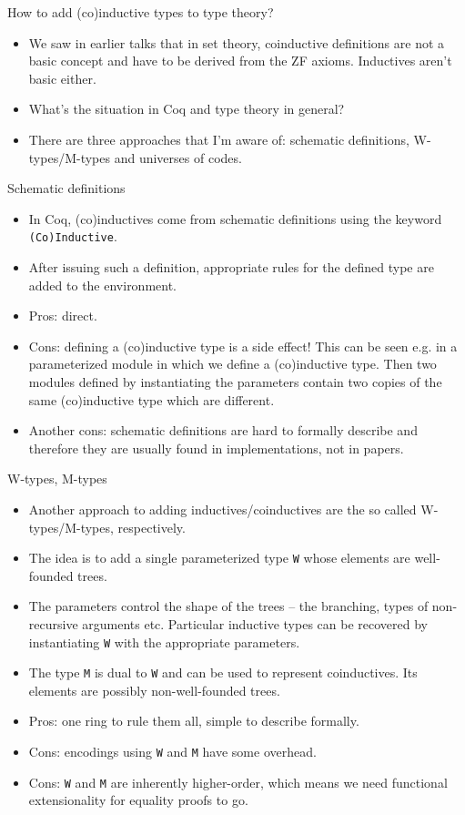 \documentclass{beamer}
\begin{document}
\begin{frame}{How to add (co)inductive types to type theory?}
\begin{itemize}
	\item We saw in earlier talks that in set theory, coinductive definitions are not a basic concept and have to be derived from the ZF axioms. Inductives aren't basic either.
	\item What's the situation in Coq and type theory in general?
	\item There are three approaches that I'm aware of: schematic definitions, W-types/M-types and universes of codes.
\end{itemize}
\end{frame}

\begin{frame}{Schematic definitions}
\begin{itemize}
	\item In Coq, (co)inductives come from schematic definitions using the keyword \texttt{(Co)Inductive}.
	\item After issuing such a definition, appropriate rules for the defined type are added to the environment.
	\item Pros: direct.
	\item Cons: defining a (co)inductive type is a side effect! This can be seen e.g. in a parameterized module in which we define a (co)inductive type. Then two modules defined by instantiating the parameters contain two copies of the same (co)inductive type which are different.
	\item Another cons: schematic definitions are hard to formally describe and therefore they are usually found in implementations, not in papers.
\end{itemize}
\end{frame}

\begin{frame}{W-types, M-types}
\begin{itemize}
	\item Another approach to adding inductives/coinductives are the so called W-types/M-types, respectively.
	\item The idea is to add a single parameterized type \texttt{W} whose elements are well-founded trees.
	\item The parameters control the shape of the trees -- the branching, types of non-recursive arguments etc. Particular inductive types can be recovered by instantiating \texttt{W} with the appropriate parameters.
	\item The type \texttt{M} is dual to \texttt{W} and can be used to represent coinductives. Its elements are possibly non-well-founded trees.
	\item Pros: one ring to rule them all, simple to describe formally.
	\item Cons: encodings using \texttt{W} and \texttt{M} have some overhead.
	\item Cons: \texttt{W} and \texttt{M} are inherently higher-order, which means we need functional extensionality for equality proofs to go.
\end{itemize}
\end{frame}
\end{document}

